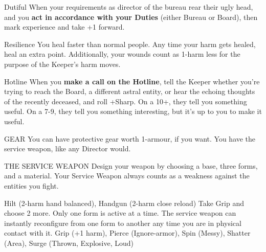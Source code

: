 {%
}{%
%
\begin{move}[]{Dutiful}
When your requirements as director of the bureau rear their ugly head, and you \textbf{act in accordance with your Duties} (either Bureau or Board), then mark experience and take +1 forward.
\end{move}%
\br[1mm]
%
\begin{move}{Resilience}
You heal faster than normal people.  Any time your harm gets healed, heal an extra point.  Additionally, your wounds count as 1-harm less for the purpose of the Keeper’s harm moves.
\end{move}%
\br[1mm]
%
\begin{move}{Hotline}
When you \textbf{make a call on the Hotline}, tell the Keeper whether you’re trying to reach the Board, a different astral entity, or hear the echoing thoughts of the recently deceased, and roll +Sharp.  On a 10+, they tell you something useful.  On a 7-9, they tell you something interesting, but it’s up to you to make it useful.
\end{move}
%
\begin{pbsect}{GEAR}
You can have protective gear worth 1-armour, if you want.  You have the service weapon, like any Director would.
\end{pbsect}%
\brln
%
\begin{pbsect}{THE SERVICE WEAPON}
Design your weapon by choosing a base, three forms, and a material.  Your Service Weapon always counts as a weakness against the entities you fight.
\end{pbsect}%
\br[2mm]
%
%
{Hilt (2-harm hand balanced),
Handgun (2-harm close reload)}%
\br[2mm]
%
%
{Take Grip and choose 2 more.  Only one form is active at a time.  The service weapon can instantly reconfigure from one form to another any time you are in physical contact with it.}%
    {Grip (+1 harm),
    Pierce (Ignore-armor),
    Spin (Messy),
    Shatter (Area),
    {Surge (Thrown, Explosive, Loud)}}%
%
}\pagebreak%
%
